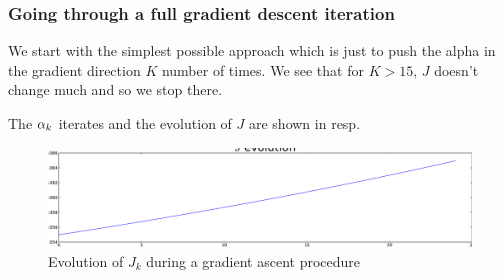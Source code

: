 \documentclass{article}
\begin{document}
\subsubsection{Going through a full gradient descent iteration}
We start with the simplest possible approach which is just to push the alpha in
the gradient direction $K$ number of times. We see that for $K> 15$, $J$ doesn't
change much and so we stop there. 

The ${\alpha}_k$ iterates and the evolution of $J$ are shown in resp.

\begin{figure}[htp]
\begin{center}
  \includegraphics[width=\textwidth]{Figs/DoublewellFBSolver/FB_J_iterates_example.pdf}
  \caption[labelInTOC]{Evolution of $J_k$ during a gradient ascent procedure}
  \label{fig:J_iterates_double_well_example}
\end{center}
\end{figure}
\end{document}
